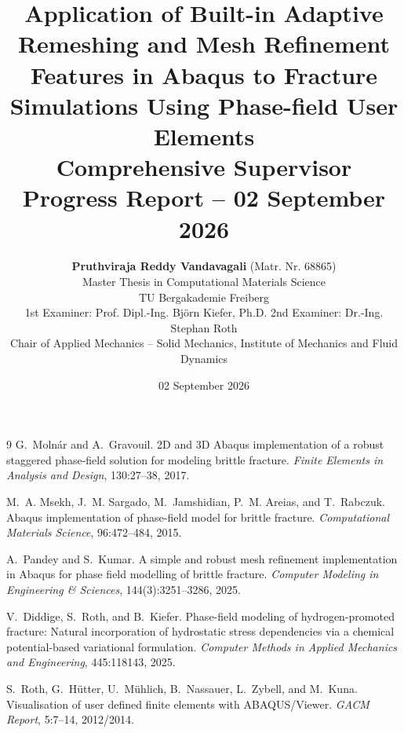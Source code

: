 \documentclass[11pt,a4paper,oneside]{report}
\title{\textbf{Application of Built-in Adaptive Remeshing and Mesh Refinement Features in Abaqus to Fracture Simulations Using Phase-field User Elements}\\[0.8em]\large Comprehensive Supervisor Progress Report -- 02 September 2026}
\author{\textbf{Pruthviraja Reddy Vandavagali} (Matr. Nr. 68865)\\[0.3em]Master Thesis in Computational Materials Science\\TU Bergakademie Freiberg\\[0.5em]\small 1st Examiner: Prof. Dipl.-Ing. Bj\"orn Kiefer, Ph.D. \quad 2nd Examiner: Dr.-Ing. Stephan Roth\\Chair of Applied Mechanics -- Solid Mechanics, Institute of Mechanics and Fluid Dynamics}
\date{02 September 2026}
\begin{document}
\maketitle
\tableofcontents
\clearpage


\clearpage











\begin{thebibliography}{9}
G.~Moln\'ar and A.~Gravouil.
\newblock 2D and 3D Abaqus implementation of a robust staggered phase-field solution for modeling brittle fracture.
\newblock \emph{Finite Elements in Analysis and Design}, 130:27--38, 2017.

M.~A. Msekh, J.~M. Sargado, M.~Jamshidian, P.~M. Areias, and T.~Rabczuk.
\newblock Abaqus implementation of phase-field model for brittle fracture.
\newblock \emph{Computational Materials Science}, 96:472--484, 2015.

A.~Pandey and S.~Kumar.
\newblock A simple and robust mesh refinement implementation in Abaqus for phase field modelling of brittle fracture.
\newblock \emph{Computer Modeling in Engineering \& Sciences}, 144(3):3251--3286, 2025.

V.~Diddige, S.~Roth, and B.~Kiefer.
\newblock Phase-field modeling of hydrogen-promoted fracture: Natural incorporation of hydrostatic stress dependencies via a chemical potential-based variational formulation.
\newblock \emph{Computer Methods in Applied Mechanics and Engineering}, 445:118143, 2025.

S.~Roth, G.~H\"utter, U.~M\"uhlich, B.~Nassauer, L.~Zybell, and M.~Kuna.
\newblock Visualisation of user defined finite elements with {ABAQUS/Viewer}.
\newblock \emph{GACM Report}, 5:7--14, 2012/2014.
\end{thebibliography}
\end{document}
